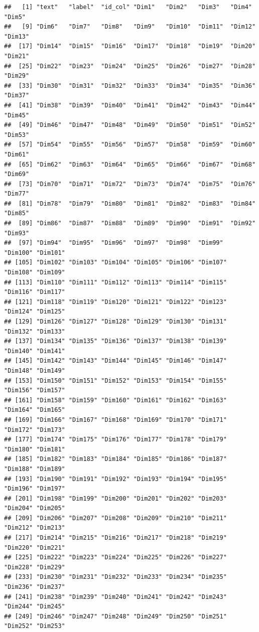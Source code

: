 \documentclass[
  english,
  man]{apa6}
\begin{document}
\begin{verbatim}
##   [1] "text"   "label"  "id_col" "Dim1"   "Dim2"   "Dim3"   "Dim4"   "Dim5"  
##   [9] "Dim6"   "Dim7"   "Dim8"   "Dim9"   "Dim10"  "Dim11"  "Dim12"  "Dim13" 
##  [17] "Dim14"  "Dim15"  "Dim16"  "Dim17"  "Dim18"  "Dim19"  "Dim20"  "Dim21" 
##  [25] "Dim22"  "Dim23"  "Dim24"  "Dim25"  "Dim26"  "Dim27"  "Dim28"  "Dim29" 
##  [33] "Dim30"  "Dim31"  "Dim32"  "Dim33"  "Dim34"  "Dim35"  "Dim36"  "Dim37" 
##  [41] "Dim38"  "Dim39"  "Dim40"  "Dim41"  "Dim42"  "Dim43"  "Dim44"  "Dim45" 
##  [49] "Dim46"  "Dim47"  "Dim48"  "Dim49"  "Dim50"  "Dim51"  "Dim52"  "Dim53" 
##  [57] "Dim54"  "Dim55"  "Dim56"  "Dim57"  "Dim58"  "Dim59"  "Dim60"  "Dim61" 
##  [65] "Dim62"  "Dim63"  "Dim64"  "Dim65"  "Dim66"  "Dim67"  "Dim68"  "Dim69" 
##  [73] "Dim70"  "Dim71"  "Dim72"  "Dim73"  "Dim74"  "Dim75"  "Dim76"  "Dim77" 
##  [81] "Dim78"  "Dim79"  "Dim80"  "Dim81"  "Dim82"  "Dim83"  "Dim84"  "Dim85" 
##  [89] "Dim86"  "Dim87"  "Dim88"  "Dim89"  "Dim90"  "Dim91"  "Dim92"  "Dim93" 
##  [97] "Dim94"  "Dim95"  "Dim96"  "Dim97"  "Dim98"  "Dim99"  "Dim100" "Dim101"
## [105] "Dim102" "Dim103" "Dim104" "Dim105" "Dim106" "Dim107" "Dim108" "Dim109"
## [113] "Dim110" "Dim111" "Dim112" "Dim113" "Dim114" "Dim115" "Dim116" "Dim117"
## [121] "Dim118" "Dim119" "Dim120" "Dim121" "Dim122" "Dim123" "Dim124" "Dim125"
## [129] "Dim126" "Dim127" "Dim128" "Dim129" "Dim130" "Dim131" "Dim132" "Dim133"
## [137] "Dim134" "Dim135" "Dim136" "Dim137" "Dim138" "Dim139" "Dim140" "Dim141"
## [145] "Dim142" "Dim143" "Dim144" "Dim145" "Dim146" "Dim147" "Dim148" "Dim149"
## [153] "Dim150" "Dim151" "Dim152" "Dim153" "Dim154" "Dim155" "Dim156" "Dim157"
## [161] "Dim158" "Dim159" "Dim160" "Dim161" "Dim162" "Dim163" "Dim164" "Dim165"
## [169] "Dim166" "Dim167" "Dim168" "Dim169" "Dim170" "Dim171" "Dim172" "Dim173"
## [177] "Dim174" "Dim175" "Dim176" "Dim177" "Dim178" "Dim179" "Dim180" "Dim181"
## [185] "Dim182" "Dim183" "Dim184" "Dim185" "Dim186" "Dim187" "Dim188" "Dim189"
## [193] "Dim190" "Dim191" "Dim192" "Dim193" "Dim194" "Dim195" "Dim196" "Dim197"
## [201] "Dim198" "Dim199" "Dim200" "Dim201" "Dim202" "Dim203" "Dim204" "Dim205"
## [209] "Dim206" "Dim207" "Dim208" "Dim209" "Dim210" "Dim211" "Dim212" "Dim213"
## [217] "Dim214" "Dim215" "Dim216" "Dim217" "Dim218" "Dim219" "Dim220" "Dim221"
## [225] "Dim222" "Dim223" "Dim224" "Dim225" "Dim226" "Dim227" "Dim228" "Dim229"
## [233] "Dim230" "Dim231" "Dim232" "Dim233" "Dim234" "Dim235" "Dim236" "Dim237"
## [241] "Dim238" "Dim239" "Dim240" "Dim241" "Dim242" "Dim243" "Dim244" "Dim245"
## [249] "Dim246" "Dim247" "Dim248" "Dim249" "Dim250" "Dim251" "Dim252" "Dim253"

\end{verbatim}
\end{document}
